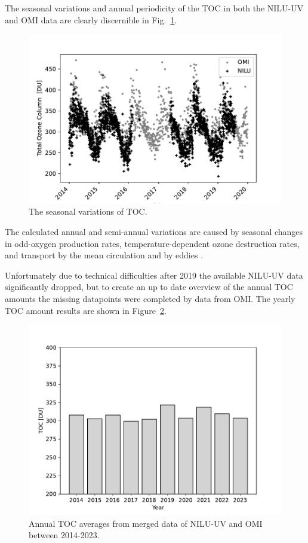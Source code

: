 \documentclass{optica-article}
\begin{document}
The seasonal variations and annual periodicity of the TOC in both the NILU-UV and OMI data are clearly discernible in Fig.~\ref{fig:omil3niluo3allyear}.


\begin{figure}[H]
	\centering
	\includegraphics[width=0.75\linewidth]{OMI_L3_NILU_O3__all_year}
	\caption{The seasonal variations of TOC.}
	\label{fig:omil3niluo3allyear}
\end{figure}


The calculated annual and semi-annual variations are caused by seasonal changes in odd-oxygen production rates, temperature-dependent ozone destruction rates, and transport by the mean circulation and by eddies \cite{Perliski:1989}.

Unfortunately due to technical difficulties after 2019 the available NILU-UV data significantly dropped, but to create an up to date overview of the annual TOC amounts the missing datapoints were completed by data from OMI. The yearly TOC amount results are shown in Figure~\ref{fig:mergedtoc}.

\begin{figure}[H]
	\centering
	\includegraphics[width=0.7\linewidth]{mergedTOC}
	\caption{Annual TOC averages from merged data of NILU-UV and OMI between 2014-2023.}
	\label{fig:mergedtoc}
\end{figure}
\end{document}
